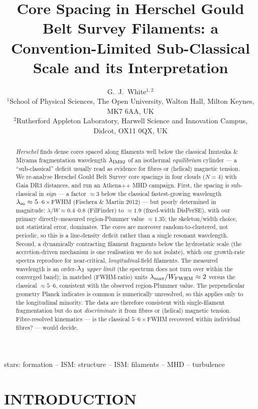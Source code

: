\documentclass[usenatbib,twoside,twocolumn]{mnras}
\title{Core Spacing in Herschel Gould Belt Survey Filaments: a Convention-Limited Sub-Classical Scale and its Interpretation}
\author[G.~J.~White]{G.~J.~White$^{1,2}$\\
$^{1}$School of Physical Sciences, The Open University, Walton Hall, Milton Keynes, MK7 6AA, UK\\
$^{2}$Rutherford Appleton Laboratory, Harwell Science and Innovation Campus, Didcot, OX11 0QX, UK}
\begin{document}
\maketitle

\begin{abstract}
\textit{Herschel} finds dense cores spaced along filaments well below the classical Inutsuka \& Miyama fragmentation wavelength $\lambda_{\rm IM92}$ of an isothermal \emph{equilibrium} cylinder --- a ``sub-classical'' deficit usually read as evidence for fibres or (helical) magnetic tension. We re-analyse Herschel Gould Belt Survey core spacings in four clouds ($N=4$) with Gaia DR3 distances, and run an Athena++ MHD campaign. First, the spacing is sub-classical in \emph{sign} --- a factor $\approx3$ below the classical fastest-growing wavelength $\lambda_{\rm m}\approx5$--$6\times$FWHM (Fischera \& Martin 2012) --- but poorly determined in magnitude: $\lambda/W\approx0.4$--$0.8$ (FilFinder) to $\approx1.9$ (fixed-width DisPerSE), with our primary directly-measured region-Plummer value $\approx1.35$; the skeleton/width choice, not statistical error, dominates. The cores are moreover random-to-clustered, not periodic, so this is a line-density deficit rather than a single resonant wavelength. Second, a dynamically contracting filament fragments below the hydrostatic scale (the accretion-driven \citealt{Clarke2016,Clarke2017} mechanism is one realisation we do not isolate), which our growth-rate spectra reproduce for near-critical, \emph{longitudinal}-field filaments. The measured wavelength is an order-$\lambda_{\rm J}$ \emph{upper limit} (the spectrum does not turn over within the converged band); in matched (FWHM-ratio) units $\lambda_{\rm max}/W_{\rm FWHM}\approx2$ versus the classical $\approx5$--$6$, consistent with the observed region-Plummer value. The perpendicular geometry Planck indicates is common is numerically unresolved, so this applies only to the longitudinal minority. The data are therefore consistent with single-filament fragmentation but do not \emph{discriminate} it from fibres or (helical) magnetic tension. Fibre-resolved kinematics --- is the classical $5$--$6\times$FWHM recovered within individual fibres? --- would decide.
\end{abstract}


\begin{keywords}
stars: formation -- ISM: structure -- ISM: filaments -- MHD -- turbulence
\end{keywords}

\section{INTRODUCTION}
\end{document}
